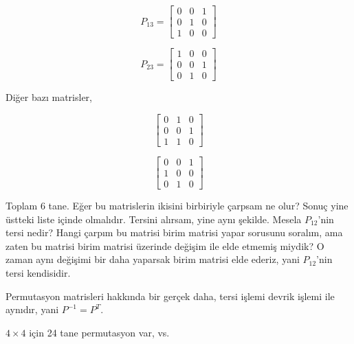 \documentclass[12pt,fleqn]{article}\usepackage{../../common}
\begin{document}
$$ P_{13} = 
\left[\begin{array}{rrr}
0 & 0 & 1\\
0 & 1 & 0 \\
1  & 0 & 0
\end{array}\right]
 $$

$$ P_{23} = 
\left[\begin{array}{rrr}
1 & 0 & 0\\
0 & 0 & 1 \\
0  & 1 & 0
\end{array}\right]
 $$

Diğer bazı matrisler, 

$$  
\left[\begin{array}{rrr}
0 & 1 & 0\\
0 & 0 & 1 \\
1  & 1 & 0
\end{array}\right]
 $$

$$     
\left[\begin{array}{rrr}
0 & 0 & 1\\
1 & 0 & 0 \\
0  & 1 & 0
\end{array}\right]
 $$             
 
Toplam 6 tane. Eğer bu matrislerin ikisini birbiriyle çarpsam ne olur?
Sonuç yine üstteki liste içinde olmalıdır. Tersini alırsam, yine aynı
şekilde. Mesela $P_{12}$'nin tersi nedir? Hangi çarpım bu matrisi birim
matrisi yapar sorusunu soralım, ama zaten bu matrisi birim matrisi üzerinde
değişim ile elde etmemiş miydik? O zaman aynı değişimi bir daha yaparsak
birim matrisi elde ederiz, yani $P_{12}$'nin tersi kendisidir. 

Permutasyon matrisleri hakkında bir gerçek daha, tersi işlemi devrik işlemi
ile aynıdır, yani $P ^{-1}  = P ^{T} $. 

$4 \times 4$ için 24 tane permutasyon var, vs.
\end{document}
